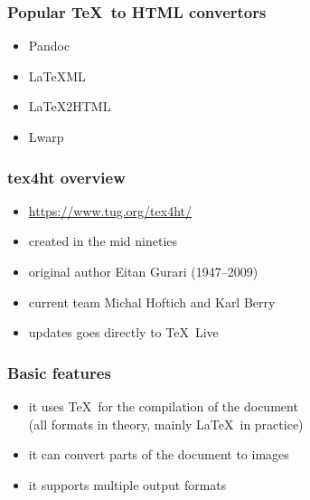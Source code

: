 




\begin{frame}
  \frametitle{Popular \TeX\ to HTML convertors}
  \begin{itemize}
    \item Pandoc
    \item LaTeXML
    \item LaTeX2HTML
    \item Lwarp
  \end{itemize}
\end{frame}



\begin{frame}
  \frametitle{tex4ht overview}
  \begin{itemize}
    \item \url{https://www.tug.org/tex4ht/}
    \item created in the mid nineties
    \item original author Eitan Gurari (1947--2009)
    \item current team Michal Hoftich and Karl Berry 
    \item updates goes directly to \TeX\ Live
  \end{itemize}
\end{frame}

\begin{frame}
  \frametitle{Basic features}
  \begin{itemize}
    \item it uses \TeX\ for the compilation of the document \\(all formats in theory, mainly \LaTeX\ in practice)
    \item it can convert parts of the document to images
    \item it supports multiple output formats
  \end{itemize}

\end{frame}



